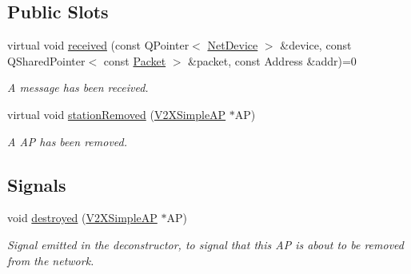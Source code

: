 \subsection*{Public Slots}
\begin{DoxyCompactItemize}
\item 
virtual void \hyperlink{classV2XSimpleAP_a48231a6cf0b61c2cbb99fc3e4b4f9cb7}{received} (const Q\+Pointer$<$ \hyperlink{classNetDevice}{Net\+Device} $>$ \&device, const Q\+Shared\+Pointer$<$ const \hyperlink{group__V2XFramework_ga1b82bfc289dbcb9aced56200d7abc964}{Packet} $>$ \&packet, const Address \&addr)=0
\begin{DoxyCompactList}\small\item\em A message has been received. \end{DoxyCompactList}\item 
virtual void \hyperlink{classV2XSimpleAP_a90c59b49f6f278f00ce3a05f433f8f81}{station\+Removed} (\hyperlink{classV2XSimpleAP}{V2\+X\+Simple\+AP} $\ast$AP)
\begin{DoxyCompactList}\small\item\em A AP has been removed. \end{DoxyCompactList}\end{DoxyCompactItemize}
\subsection*{Signals}
\begin{DoxyCompactItemize}
\item 
void \hyperlink{classV2XSimpleAP_a078a901cc02dd14b395c7907cc0c6238}{destroyed} (\hyperlink{classV2XSimpleAP}{V2\+X\+Simple\+AP} $\ast$AP)
\begin{DoxyCompactList}\small\item\em Signal emitted in the deconstructor, to signal that this AP is about to be removed from the network. \end{DoxyCompactList}\end{DoxyCompactItemize}
